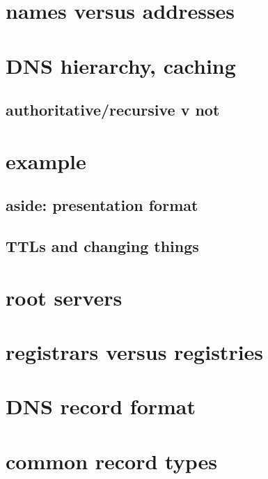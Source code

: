 \section{names versus addresses}


\section{DNS hierarchy, caching}




\subsection{authoritative/recursive v not}


\section{example}


\subsection{aside: presentation format}


\subsection{TTLs and changing things}



\section{root servers}


\section{registrars versus registries}


\section{DNS record format}


\section{common record types}


